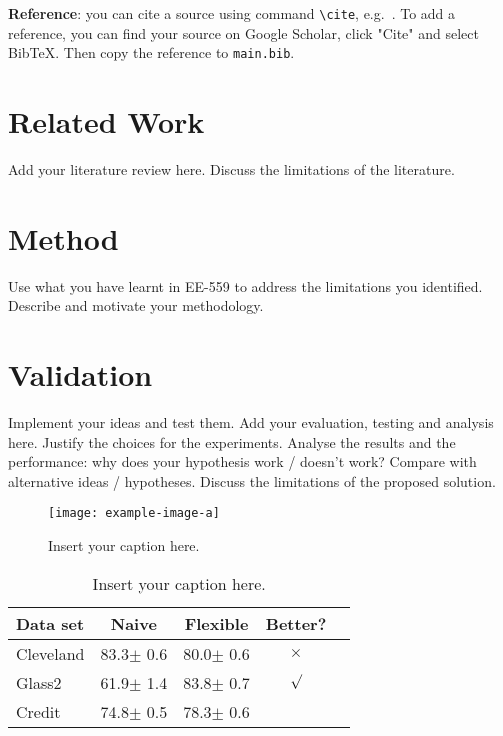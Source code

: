 \documentclass{article}
\begin{document}
\textbf{Reference}: you can cite a source using command \texttt{\textbackslash cite}, e.g.~\cite{vaswani2017attention}. 
    To add a reference, you can find your source on Google Scholar, click "Cite" and select BibTeX. Then copy the reference to \texttt{main.bib}. 
    

\section{Related Work}
\label{sec:related_work}

Add your literature review here. Discuss the limitations of the literature.

\section{Method}
\label{sec:method}

Use what you have learnt in EE-559 to address the limitations you identified. Describe and motivate your methodology. 

\section{Validation}
\label{sec:validation}

Implement your ideas and test them. Add your evaluation, testing and analysis here. Justify the choices for the experiments. Analyse the results and the performance: why does your hypothesis work / doesn’t work? Compare with alternative ideas / hypotheses. Discuss the limitations of the proposed solution.


 \begin{figure}[t!]
        \centering
        \texttt{[image: example-image-a]}
        \caption{Insert your caption here.}
        \label{fig:example}
    \end{figure}


     \begin{table}[t]
    \vskip 0.15in
    \begin{center}
    \begin{small}
    \begin{sc}
    \begin{tabular}{lcccr}
    \toprule
    Data set & Naive & Flexible & Better? \\
    \midrule
    Cleveland & 83.3$\pm$ 0.6& 80.0$\pm$ 0.6& $\times$\\
    Glass2    & 61.9$\pm$ 1.4& 83.8$\pm$ 0.7& $\surd$ \\
    Credit    & 74.8$\pm$ 0.5& 78.3$\pm$ 0.6&         \\
    \bottomrule
    \end{tabular}
    \caption{Insert your caption here.}
    \label{tab:example}
    \end{sc}
    \end{small}
    \end{center}
    \vskip -0.1in
    \end{table}
\end{document}
